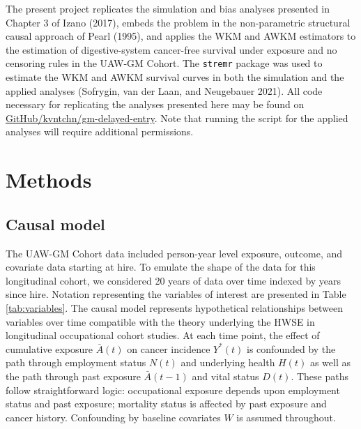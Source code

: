 \documentclass[
  11pt,
]{article}
\begin{document}
The present project replicates the simulation and bias analyses
presented in Chapter 3 of Izano (2017), embeds the problem in the
non-parametric structural causal approach of Pearl (1995), and applies
the WKM and AWKM estimators to the estimation of digestive-system
cancer-free survival under exposure and no censoring rules in the UAW-GM
Cohort. The \texttt{stremr} package was used to estimate the WKM and
AWKM survival curves in both the simulation and the applied analyses
(Sofrygin, van der Laan, and Neugebauer 2021). All code necessary for
replicating the analyses presented here may be found on
\href{https://github.com/kvntchn/gm-delayed-entry.git}{GitHub/kvntchn/gm-delayed-entry}.
Note that running the script for the applied analyses will require
additional permissions.

\hypertarget{methods}{%
\section{Methods}\label{methods}}

\hypertarget{causal-model}{%
\subsection{Causal model}\label{causal-model}}

The UAW-GM Cohort data included person-year level exposure, outcome, and
covariate data starting at hire. To emulate the shape of the data for
this longitudinal cohort, we considered 20 years of data over time
indexed by years since hire. Notation representing the variables of
interest are presented in Table \ref{tab:variables}. The causal model
represents hypothetical relationships between variables over time
compatible with the theory underlying the HWSE in longitudinal
occupational cohort studies. At each time point, the effect of
cumulative exposure \(\bar A(t)\) on cancer incidence \(Y^*(t)\) is
confounded by the path through employment status \(N(t)\) and underlying
health \(H(t)\) as well as the path through past exposure
\(\bar A(t - 1)\) and vital status \(D(t)\). These paths follow
straightforward logic: occupational exposure depends upon employment
status and past exposure; mortality status is affected by past exposure
and cancer history. Confounding by baseline covariates \(W\) is assumed
throughout.
\end{document}
